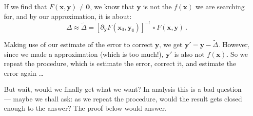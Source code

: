 \documentclass[openany]{book}
\theoremstyle{plain}
\theoremstyle{definition}
\newcommand*{\bv}{\boldsymbol} %
\begin{document}
If we find that $F(\bv x, \bv y) \neq \bv 0$, we know that $\bv y$ is not the $f(\bv x)$ we are searching for, and by our approximation, it is about:
\begin{equation*}
	\Delta \approx \tilde{\Delta} = [\partial_{\bv y} F(\bv x_0, \bv y_0)]^{-1} \circ F(\bv x, \bv y)\,.
\end{equation*}

Making use of our estimate of the error to correct $\bv y$, we get $\bv y' = \bv y - \tilde \Delta$. 
However, since we made a approximation (which is too much!), $\bv y'$ is also not $f(\bv x)$. So we repeat the procedure, which is estimate the error, correct it, and estimate the error again \ldots

But wait, would we finally get what we want? 
In analysis this is a bad question --- maybe we shall ask: as we repeat the procedure, would the result gets closed enough to the answer? 
The proof below would answer.
\end{document}
